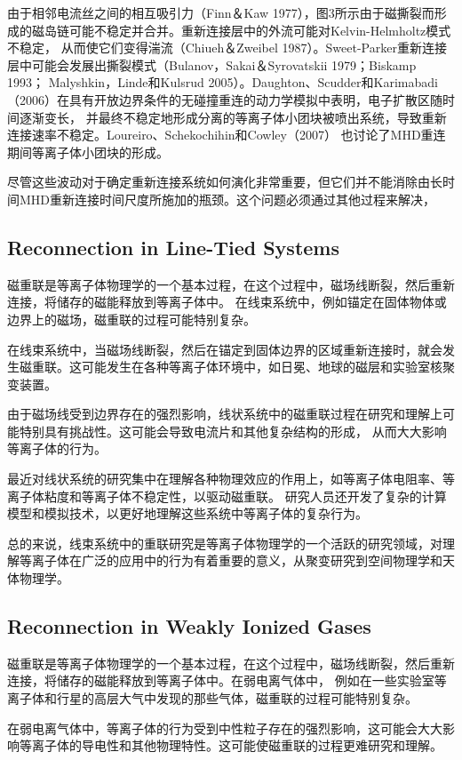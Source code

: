 \documentclass[12pt, a4paper, oneside]{article}
\begin{document}
\begin{spacing}{2.0}
由于相邻电流丝之间的相互吸引力（Finn＆Kaw 1977），图3所示由于磁撕裂而形成的磁岛链可能不稳定并合并。重新连接层中的外流可能对Kelvin-Helmholtz模式不稳定，
从而使它们变得湍流（Chiueh＆Zweibel 1987）。Sweet-Parker重新连接层中可能会发展出撕裂模式（Bulanov，Sakai＆Syrovatskii 1979；Biskamp 1993；
Malyshkin，Linde和Kulsrud 2005）。Daughton、Scudder和Karimabadi（2006）在具有开放边界条件的无碰撞重连的动力学模拟中表明，电子扩散区随时间逐渐变长，
并最终不稳定地形成分离的等离子体小团块被喷出系统，导致重新连接速率不稳定。Loureiro、Schekochihin和Cowley（2007）
也讨论了MHD重连期间等离子体小团块的形成。

尽管这些波动对于确定重新连接系统如何演化非常重要，但它们并不能消除由长时间MHD重新连接时间尺度所施加的瓶颈。这个问题必须通过其他过程来解决，
\subsection{Reconnection in Line-Tied Systems}
磁重联是等离子体物理学的一个基本过程，在这个过程中，磁场线断裂，然后重新连接，将储存的磁能释放到等离子体中。
在线束系统中，例如锚定在固体物体或边界上的磁场，磁重联的过程可能特别复杂。

在线束系统中，当磁场线断裂，然后在锚定到固体边界的区域重新连接时，就会发生磁重联。这可能发生在各种等离子体环境中，如日冕、地球的磁层和实验室核聚变装置。

由于磁场线受到边界存在的强烈影响，线状系统中的磁重联过程在研究和理解上可能特别具有挑战性。这可能会导致电流片和其他复杂结构的形成，
从而大大影响等离子体的行为。

最近对线状系统的研究集中在理解各种物理效应的作用上，如等离子体电阻率、等离子体粘度和等离子体不稳定性，以驱动磁重联。
研究人员还开发了复杂的计算模型和模拟技术，以更好地理解这些系统中等离子体的复杂行为。

总的来说，线束系统中的重联研究是等离子体物理学的一个活跃的研究领域，对理解等离子体在广泛的应用中的行为有着重要的意义，从聚变研究到空间物理学和天体物理学。


\subsection{Reconnection in Weakly Ionized Gases}
磁重联是等离子体物理学的一个基本过程，在这个过程中，磁场线断裂，然后重新连接，将储存的磁能释放到等离子体中。在弱电离气体中，
例如在一些实验室等离子体和行星的高层大气中发现的那些气体，磁重联的过程可能特别复杂。

在弱电离气体中，等离子体的行为受到中性粒子存在的强烈影响，这可能会大大影响等离子体的导电性和其他物理特性。这可能使磁重联的过程更难研究和理解。


\end{spacing}
\end{document}
